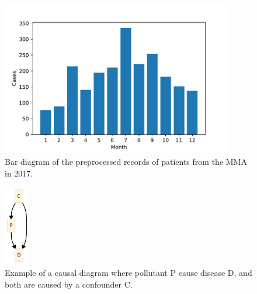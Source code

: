 \documentclass[
  11pt,
  a4paper,
  oneside
]{article}
\begin{document}
\begin{figure}
	\centering
        \includegraphics[width=0.9\textwidth]{figs/2017bymonth.pdf}
    \vspace*{-5mm}
	\caption{Bar diagram of the preprocessed records of patients from the MMA in 2017.}
	\label{fig:2017bymonth}
\end{figure}

\begin{figure}
    \centering
    \includegraphics[width=0.1\textwidth]{figs/causation_example.png}
    \caption{Example of a causal diagram where pollutant P cause disease D, and both are caused by a confounder C.}
    \label{fig:causation_example}
\end{figure}
\end{document}
